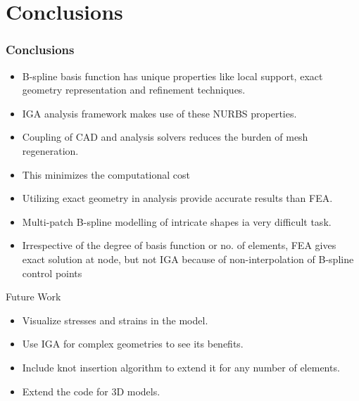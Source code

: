 \documentclass{beamer}
\begin{document}
\section{Conclusions}
\begin{frame}[allowframebreaks] \frametitle{Conclusions}
  \begin{itemize}
      \item B-spline basis function has unique properties like local support, exact geometry representation and refinement techniques.
      \item IGA analysis framework makes use of these NURBS properties.
      \item Coupling of CAD and analysis solvers reduces the burden of mesh regeneration.
      \item This minimizes the computational cost
      \item Utilizing exact geometry in analysis provide accurate results than FEA. 
      \item Multi-patch B-spline modelling of intricate shapes ia very difficult task.
      \item Irrespective of the degree of basis function or no. of elements, FEA gives exact solution at node, but not IGA because of non-interpolation of B-spline control points
      
  \end{itemize}

\end{frame}
\newpage
\begin{frame}{Future Work}
\begin{itemize}
    \item Visualize stresses and strains in the model.
    \item Use IGA for complex geometries to see its benefits.
    \item Include knot insertion algorithm to extend it for any number of elements.
    \item Extend the code for 3D models.
    
\end{itemize}
    
\end{frame}

\end{document}
